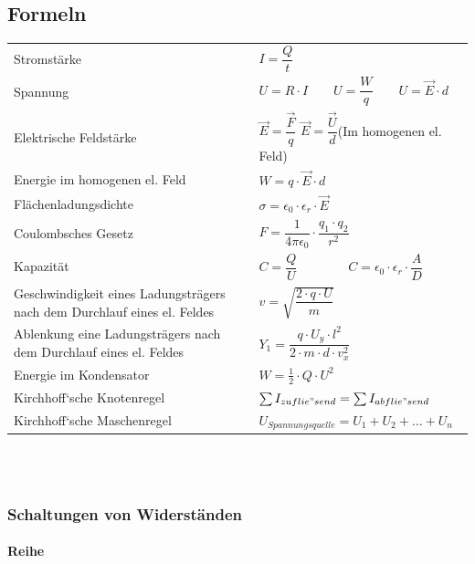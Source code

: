 \documentclass[a4paper]{article}
\begin{document}
\subsection{Formeln}

\renewcommand{\arraystretch}{4}
\begin{tabular}{p{6cm} p{10cm}}
	Stromstärke																	& $I = \dfrac{Q}{t}$\\
	Spannung																	& $U = R \cdot I  \qquad U = \dfrac{W}{q}  \qquad U = \vec{E} \cdot d$\\
	Elektrische Feldstärke														& $\vec{E} = \dfrac{\vec{F}}{q}$ \qquad $\vec{E} = \dfrac{\vec{U}}{d}$\qquad \small(Im homogenen el. Feld)\\
	Energie im homogenen el. Feld												& $W = q \cdot \vec{E} \cdot d$\\
	Flächenladungsdichte														& $\sigma = \epsilon_0 \cdot \epsilon_r \cdot \vec{E}$\\
	Coulombsches Gesetz															& $F = \dfrac{1}{4 \pi \epsilon_0} \cdot \dfrac{q_1 \cdot q_2}{r^2}$\\
	Kapazität																	& $C = \dfrac{Q}{U} \qquad\qquad C = \epsilon_0 \cdot \epsilon_r \cdot \dfrac{A}{D}$\\
	Geschwindigkeit eines Ladungsträgers nach dem Durchlauf eines el. Feldes	& $v = \sqrt{\dfrac{2 \cdot q \cdot U}{m}}$\\
	Ablenkung eine Ladungsträgers nach dem Durchlauf eines el. Feldes			& $Y_1 = \dfrac{q \cdot U_y \cdot l^2}{2 \cdot m \cdot d \cdot v_x ^2}$\\
	Energie im Kondensator														& $W = \frac{1}{2} \cdot Q \cdot U^2$\\
	Kirchhoff‘sche Knotenregel													& $\sum{I_{zuflie"send}} = \sum{I_{abflie"send}}$\\
	Kirchhoff‘sche Maschenregel													& $U_{Spannungsquelle} = U_1  +  U_2 + \dots + U_n$\\
\end{tabular}
\renewcommand{\arraystretch}{1}
\\\\


\subsubsection{Schaltungen von Widerständen}
\paragraph{Reihe}
\end{document}
